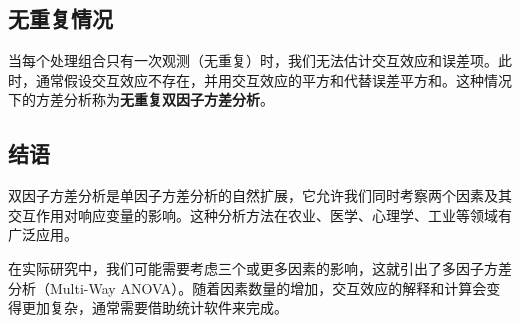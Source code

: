 \documentclass[12pt, a4paper]{amsart}
\begin{document}
\subsection{无重复情况}
当每个处理组合只有一次观测（无重复）时，我们无法估计交互效应和误差项。此时，通常假设交互效应不存在，并用交互效应的平方和代替误差平方和。这种情况下的方差分析称为\textbf{无重复双因子方差分析}。

\subsection{结语}
双因子方差分析是单因子方差分析的自然扩展，它允许我们同时考察两个因素及其交互作用对响应变量的影响。这种分析方法在农业、医学、心理学、工业等领域有广泛应用。

在实际研究中，我们可能需要考虑三个或更多因素的影响，这就引出了多因子方差分析（Multi-Way ANOVA）。随着因素数量的增加，交互效应的解释和计算会变得更加复杂，通常需要借助统计软件来完成。
\end{document}
